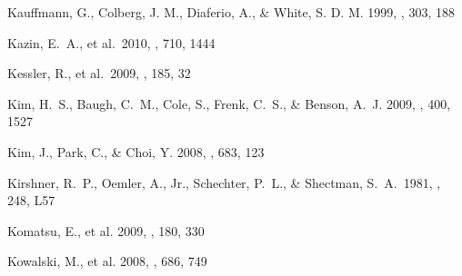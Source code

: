 \documentclass[]{emulateapj}
\begin{document}
\begin{thebibliography}{999}
Kauffmann, G., Colberg, J. M., Diaferio, A., \& White, S. D. M. 1999,
\mnras, 303, 188




Kazin, E.~A., et al.\ 2010, \apj, 710, 1444

Kessler, R., et al.\ 2009, \apjs, 185, 32 

Kim, H.\ S., Baugh, C.\ M., Cole, S., Frenk, C.\ S., \& Benson, A.\ J. 2009,
\mnras, 400, 1527 %

Kim, J., Park, C., \& Choi, Y. 2008, \apj, 683, 123

Kirshner, R.~P., Oemler, A., Jr., Schechter, P.~L.,
\& Shectman, S.~A.\ 1981, \apjl, 248, L57


Komatsu, E., et al. 2009, \apjs, 180, 330

Kowalski, M., et al. 2008, \apj, 686, 749 


\end{thebibliography}
\end{document}
